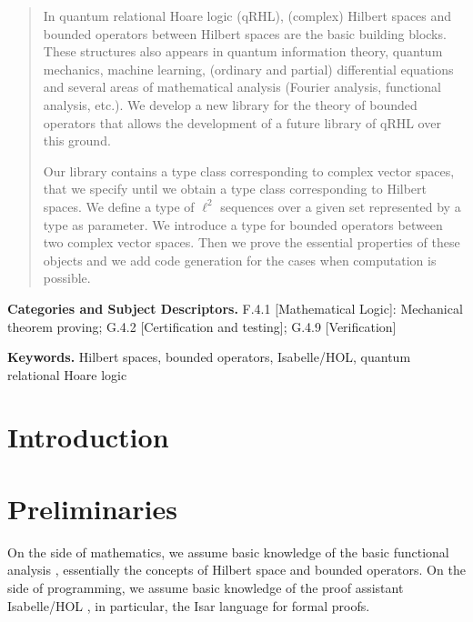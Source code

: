 \documentclass[12pt]{article}
\theoremstyle{definition}
\begin{document}
\maketitle

\begin{abstract}
In quantum relational Hoare logic (qRHL), (complex) Hilbert spaces and bounded operators between Hilbert spaces are the basic building blocks. These structures also appears in quantum information theory, quantum mechanics, machine learning, (ordinary and partial) differential equations and several areas of mathematical analysis (Fourier analysis, functional analysis, etc.). We develop a new library for the theory of bounded operators that allows the development of a future library of qRHL over this ground.

Our library contains a type class corresponding to complex vector spaces, that we specify until we obtain a type class corresponding to Hilbert spaces. We define a type of $\ell^2$ sequences over a given set represented by a type as parameter. We introduce a type for bounded operators between two complex vector spaces. Then we prove the essential properties of these objects and we add code generation for the cases when computation is possible.
\end{abstract}


\begin{flushleft}
\textbf{Categories and Subject Descriptors.} F.4.1 [Mathematical Logic]:
Mechanical theorem proving; G.4.2 [Certification and testing]; G.4.9 [Verification]

\textbf{Keywords.} Hilbert spaces, bounded operators, Isabelle/HOL,
quantum relational Hoare logic
\end{flushleft}

\section{Introduction}
\cite{unruh2019quantum}

\blindtext[4]


\section{Preliminaries}
On the side of mathematics, we assume basic knowledge of the basic functional analysis \cite{conway2019course}, essentially the concepts of Hilbert space and bounded operators. On the side of programming, we assume basic knowledge of the proof assistant Isabelle/HOL \cite{nipkow2002isabelle}, in particular, the Isar language for formal proofs.
\end{document}
